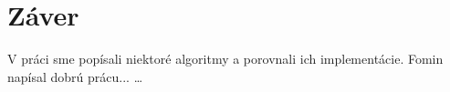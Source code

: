 \cleardoublepage
{}
{}
\chapter*{Záver}\label{chap:zaver}

V práci sme popísali niektoré algoritmy a porovnali ich implementácie. 
Fomin \citep{fomin05} napísal dobrú prácu... \ldots

\begin{comment}
dátové štruktúry union-find, písmenkový strom a sufixový 
strom (kapitoly~\ref{chap:uf}, \ref{chap:trie} a \ref{chap:sx}). Spísali sme 
návrh a implementáciu softvéru. Softvér sme implementovali 
podľa návrhu a splnili sme všetku funkcionalitu: vizualizovali sme všetky 
dátové štruktúry a algoritmy, doplnili funkčnosť, spravili komentáre v 
angličtine a slovenčine.

V ďalšom vývoji by sme chceli prerobiť komentáre pre sufixové stromy, keďže sa 
nám zdajú byť neprehľadné. Taktiež by sme chceli zvýrazniť niektoré časti 
Ukkonenovho algoritmu a pridať nové algoritmy vymenované v sekcií 
\ref{sec:sx:usage}.

Softvér by sme chceli v budúcnosti rozšíriť o nové dátové štruktúry, ktoré sa 
týkajú stringológie, napríklad \emph{radix tree}, \emph{PATRICIA}, 
\emph{orientovaný acyklický graf pre slová (DAWG)}, \emph{všeobecný sufixový 
strom}.

Chceli by sme projekt podstúpiť širšiemu použitiu a zozbierať viac spätnej 
väzby, aby sme softvér odladili podľa používateľských potrieb a opravili 
chyby, ktoré sme neobjavili. 
\end{comment}


\cleardoublepage
{}
{}

\printbibliography

\backmatter

\newpage
\pagestyle{empty}
\hbox{}